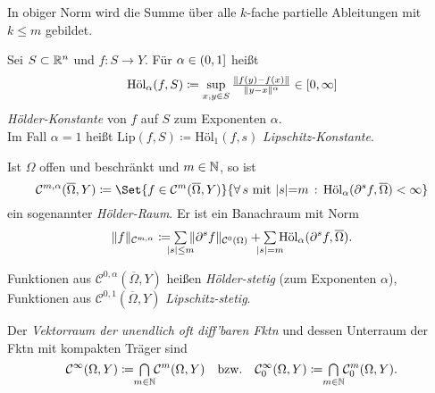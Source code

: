 \documentclass{cheat-sheet}
\newcommand{\Hoel}{\mathrm{\text{Höl}}} %
\begin{document}
\begin{bem}
  In obiger Norm wird die Summe über alle $k$-fache partielle Ableitungen mit $k \leq m$ gebildet.
\end{bem}


\begin{defn}
  Sei $S \subset \mathbb{R}^n$ und $f : S \to Y$. Für $\alpha \in \left( 0, 1 \right]$ heißt
  \[ \Hoel_\alpha(f, S) \coloneqq \sup_{x, y \in S} \tfrac{\norm{f(y)-f(x)}}{\norm{y-x}^\alpha} \in \cinterval{0}{\infty} \]
  \emph{Hölder-Konstante} von $f$ auf $S$ zum Exponenten $\alpha$.\\
  Im Fall $\alpha {=} 1$ heißt $\mathrm{Lip}(f, S) \coloneqq \Hoel_1(f, s)$ \emph{Lipschitz-Konstante}.
\end{defn}

\begin{defn}
  Ist $\Omega$ offen und beschränkt und $m \in \mathbb{N}$, so ist
  \[ \mathcal{C}^{m,\alpha}(\overline{\Omega}, Y) \coloneqq \Set{ f \in \mathcal{C}^m(\overline{\Omega}, Y) }{ \fa{s \text{ mit } \abs{s} {=} m} \Hoel_\alpha(\partial^s f, \overline{\Omega}) < \infty } \]
  ein sogenannter \emph{Hölder-Raum}. Er ist ein Banachraum mit Norm
  \[ \norm{f}_{\mathcal{C}^{m,\alpha}} \coloneqq \sum_{\mathclap{\abs{s} \leq m}} \, \norm{\partial^s f}_{\mathcal{C}^0(\Omega)} + \sum_{\mathclap{\abs{s} = m}} \Hoel_\alpha(\partial^s f, \overline{\Omega}). \]
\end{defn}

\begin{defn}
  Funktionen aus $\mathcal{C}^{0,\alpha}(\overline{\Omega}, Y)$ heißen \emph{Hölder-stetig} (zum Exponenten $\alpha$), Funktionen aus $\mathcal{C}^{0,1}(\overline{\Omega}, Y)$ \emph{Lipschitz-stetig}.
\end{defn}

\begin{defn}
  Der \emph{Vektorraum der unendlich oft diff'baren Fktn} und dessen Unterraum der Fktn mit kompakten Träger sind
  \[
    \mathcal{C}^\infty(\Omega, Y) \coloneqq \, \bigcap_{\mathclap{m \in \N}} \, \mathcal{C}^m(\Omega, Y)
    \quad \text{bzw.} \quad
    \mathcal{C}_0^\infty(\Omega, Y) \coloneqq \, \bigcap_{\mathclap{m \in \N}} \, \mathcal{C}_0^m(\Omega, Y).
  \]
\end{defn}

\end{document}
